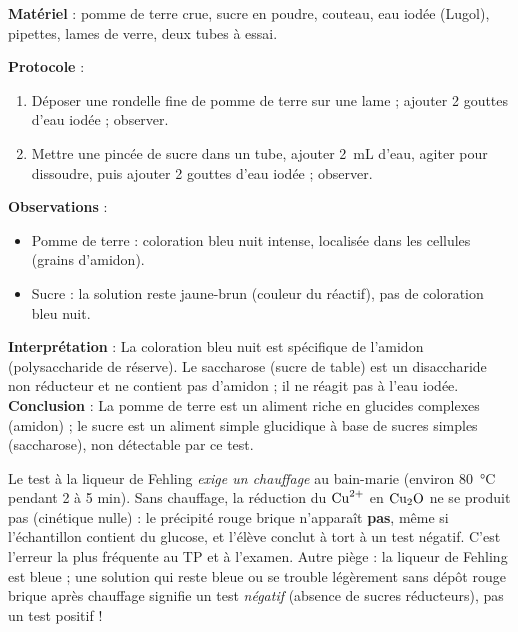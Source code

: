 \documentclass[11pt]{article}
\begin{document}
\begin{experience}
\textbf{Matériel} : pomme de terre crue, sucre en poudre, couteau, eau iodée (Lugol), pipettes, lames de verre, deux tubes à essai.\par
\textbf{Protocole} :
\begin{enumerate}
\item Déposer une rondelle fine de pomme de terre sur une lame ; ajouter 2 gouttes d'eau iodée ; observer.
\item Mettre une pincée de sucre dans un tube, ajouter \SI{2}{mL} d'eau, agiter pour dissoudre, puis ajouter 2 gouttes d'eau iodée ; observer.
\end{enumerate}
\textbf{Observations} :
\begin{itemize}
\item Pomme de terre : coloration bleu nuit intense, localisée dans les cellules (grains d'amidon).
\item Sucre : la solution reste jaune-brun (couleur du réactif), pas de coloration bleu nuit.
\end{itemize}
\textbf{Interprétation} : La coloration bleu nuit est spécifique de l'amidon (polysaccharide de réserve). Le saccharose (sucre de table) est un disaccharide non réducteur et ne contient pas d'amidon ; il ne réagit pas à l'eau iodée.
\textbf{Conclusion} : La pomme de terre est un aliment riche en glucides complexes (amidon) ; le sucre est un aliment simple glucidique à base de sucres simples (saccharose), non détectable par ce test.
\end{experience}

\begin{attention}
Le test à la liqueur de Fehling \emph{exige un chauffage} au bain-marie (environ \SI{80}{\celsius} pendant 2 à 5 min). Sans chauffage, la réduction du $\ce{Cu^2+}$ en $\ce{Cu2O}$ ne se produit pas (cinétique nulle) : le précipité rouge brique n'apparaît \textbf{pas}, même si l'échantillon contient du glucose, et l'élève conclut à tort à un test négatif. C'est l'erreur la plus fréquente au TP et à l'examen. Autre piège : la liqueur de Fehling est bleue ; une solution qui reste bleue ou se trouble légèrement sans dépôt rouge brique après chauffage signifie un test \emph{négatif} (absence de sucres réducteurs), pas un test positif !
\end{attention}
\end{document}
